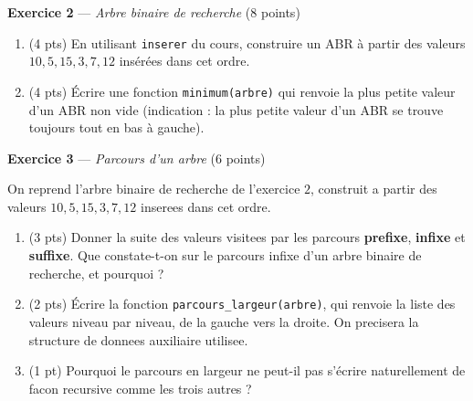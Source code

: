 \textbf{Exercice 2} --- \textit{Arbre binaire de recherche} \hfill (8 points)

\begin{enumerate}
  \item (4 pts) En utilisant \lstinline{inserer} du cours, construire un ABR à partir des valeurs $10, 5, 15, 3, 7, 12$ insérées dans cet ordre.
  \item (4 pts) Écrire une fonction \lstinline{minimum(arbre)} qui renvoie la plus petite valeur d'un ABR non vide (indication : la plus petite valeur d'un ABR se trouve toujours tout en bas à gauche).
\end{enumerate}


\bigskip

\textbf{Exercice 3} --- \textit{Parcours d'un arbre} \hfill (6 points)

On reprend l'arbre binaire de recherche de l'exercice $2$, construit a partir des valeurs
$10, 5, 15, 3, 7, 12$ inserees dans cet ordre.

\begin{enumerate}
  \item (3 pts) Donner la suite des valeurs visitees par les parcours \textbf{prefixe},
  \textbf{infixe} et \textbf{suffixe}. Que constate-t-on sur le parcours infixe d'un arbre
  binaire de recherche, et pourquoi ?
  \item (2 pts) Écrire la fonction \lstinline{parcours_largeur(arbre)}, qui renvoie la liste
  des valeurs niveau par niveau, de la gauche vers la droite. On precisera la structure de
  donnees auxiliaire utilisee.
  \item (1 pt) Pourquoi le parcours en largeur ne peut-il pas s'écrire naturellement de
  facon recursive comme les trois autres ?
\end{enumerate}

